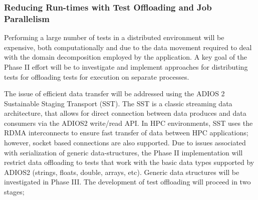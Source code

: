 \subsubsection{Reducing Run-times with Test Offloading and Job Parallelism}

Performing a large number of \VV tests in a distributed environment will be expensive, both computationally and due to the data movement required to deal with the domain decomposition employed by the application. A key goal of the Phase II effort will be to investigate and implement approaches for distributing tests for offloading tests for execution on separate processes. 

The issue of efficient data transfer will be addressed using the ADIOS 2 Sustainable Staging Transport (SST). The SST is a classic streaming data architecture, that allows for direct connection between data produces and data consumers via the ADIOS2 write/read API. In HPC environments, SST uses the RDMA interconnects to ensure fast transfer of data between HPC applications; however, socket based connections are also supported. Due to issues associated with serialization of generic data-structures, the Phase II implementation will restrict data offloading to tests that work with the basic data types supported by ADIOS2 (strings, floats, double, arrays, etc). Generic data structures will be investigated in Phase III. The development of test offloading will proceed in two stages; 

